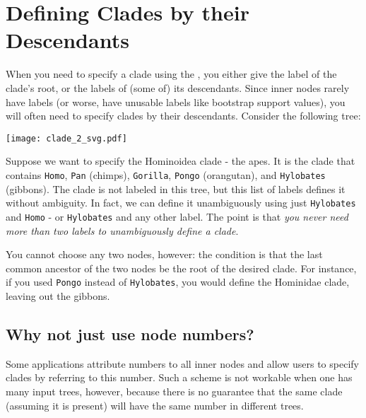 \chapter{Defining Clades by their Descendants}
\label{sct_def_clades}

When you need to specify a clade using the \nutils{}, you either give the label
of the clade's root, or the labels of (some of) its descendants. Since inner
nodes rarely have labels (or worse, have unusable labels like bootstrap
support values), you will often need to specify clades by their descendants.
Consider the following tree:

\begin{center}
\texttt{[image: clade\_2\_svg.pdf]} 
\end{center}

\noindent{}Suppose we want to specify the Hominoidea clade - the apes. It is
the clade that contains \texttt{Homo}, \texttt{Pan} (chimps), \texttt{Gorilla},
\texttt{Pongo} (orangutan), and \texttt{Hylobates} (gibbons). The clade is not
labeled in this tree, but this list of labels defines it without ambiguity. In
fact, we can define it unambiguously using just \texttt{Hylobates} and
\texttt{Homo} - or \texttt{Hylobates} and any other label. The point is that
\emph{you never need more than two labels to unambiguously define a clade}.

You cannot choose any two nodes, however: the condition is that the last
common ancestor of the two nodes be the root of the desired clade. For
instance, if you used \texttt{Pongo} instead of \texttt{Hylobates}, you would
define the Hominidae clade, leaving out the gibbons.

\section{Why not just use node numbers?}

Some applications attribute numbers to all inner nodes and allow users to
specify clades by referring to this number. Such a scheme is not workable when
one has many input trees, however, because there is no guarantee that the same
clade (assuming it is present) will have the same number in different trees.
